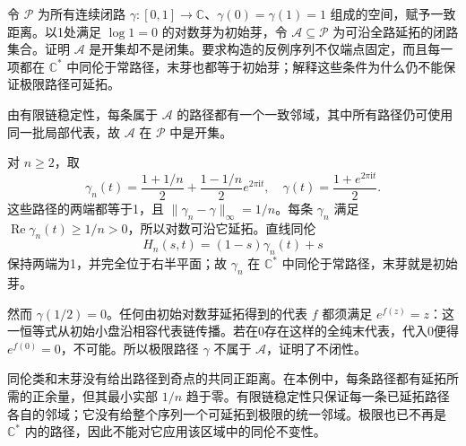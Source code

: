 \begin{exercise}\label{b3:ex:09-7}
令 \(\mathcal P\) 为所有连续闭路 \(\gamma:[0,1]\to\mathbb C\)、\(\gamma(0)=\gamma(1)=1\) 组成的空间，赋予一致距离。以1处满足 \(\log1=0\) 的对数芽为初始芽，令 \(\mathcal A\subseteq\mathcal P\) 为可沿全路延拓的闭路集合。证明 \(\mathcal A\) 是开集却不是闭集。要求构造的反例序列不仅端点固定，而且每一项都在 \(\mathbb C^*\) 中同伦于常路径，末芽也都等于初始芽；解释这些条件为什么仍不能保证极限路径可延拓。
\end{exercise}
\begin{solution}
由有限链稳定性，每条属于 \(\mathcal A\) 的路径都有一个一致邻域，其中所有路径仍可使用同一批局部代表，故 \(\mathcal A\) 在 \(\mathcal P\) 中是开集。

对 \(n\ge2\)，取
\[
 \gamma_n(t)=\frac{1+1/n}{2}
       +\frac{1-1/n}{2}e^{2\pi\mathrm i t},\quad
 \gamma(t)=\frac{1+e^{2\pi\mathrm i t}}2.
\]
这些路径的两端都等于1，且 \(\|\gamma_n-\gamma\|_\infty=1/n\)。每条 \(\gamma_n\) 满足 \(\operatorname{Re}\gamma_n(t)\ge1/n>0\)，所以对数可沿它延拓。直线同伦
\[
 H_n(s,t)=(1-s)\gamma_n(t)+s
\]
保持两端为1，并完全位于右半平面；故 \(\gamma_n\) 在 \(\mathbb C^*\) 中同伦于常路径，末芽就是初始芽。

然而 \(\gamma(1/2)=0\)。任何由初始对数芽延拓得到的代表 \(f\) 都须满足 \(e^{f(z)}=z\)：这一恒等式从初始小盘沿相容代表链传播。若在0存在这样的全纯末代表，代入0便得 \(e^{f(0)}=0\)，不可能。所以极限路径 \(\gamma\) 不属于 \(\mathcal A\)，证明了不闭性。

同伦类和末芽没有给出路径到奇点的共同正距离。在本例中，每条路径都有延拓所需的正余量，但其最小实部 \(1/n\) 趋于零。有限链稳定性只保证每一条已延拓路径各自的邻域；它没有给整个序列一个可延拓到极限的统一邻域。极限也已不再是 \(\mathbb C^*\) 内的路径，因此不能对它应用该区域中的同伦不变性。
\end{solution}

